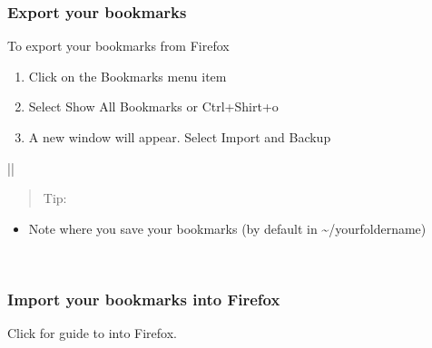 \documentclass[letterpaper,10pt,english]{sphinxmanual}
\begin{document}
\subsubsection{Export your bookmarks}
\label{\detokenize{docs/software:export-your-bookmarks}}
To export your bookmarks from Firefox
\begin{enumerate}
\item {} 
Click on the Bookmarks menu item

\item {} 
Select Show All Bookmarks or Ctrl+Shirt+o

\item {} 
A new window will appear. Select Import and Backup

\end{enumerate}


\begin{savenotes}\sphinxattablestart
\centering
\begin{tabular}[t]{|*{1}{|}}
\hline
\begin{quote}

Tip:
\end{quote}
\begin{itemize}
\item {} 
Note where you save your bookmarks (by default in \textasciitilde{}/yourfoldername)

\end{itemize}
\\
\hline
\end{tabular}
\par
\sphinxattableend\end{savenotes}


\subsubsection{Import your bookmarks into Firefox}
\label{\detokenize{docs/software:import-your-bookmarks-into-firefox}}
Click for guide to  into Firefox.
\end{document}
